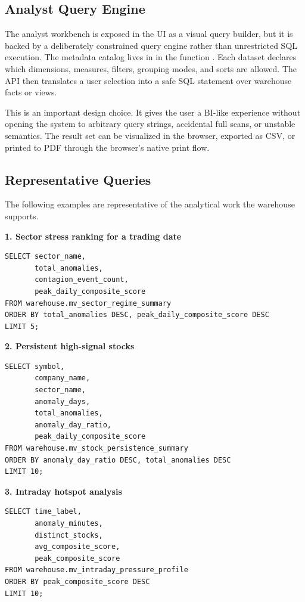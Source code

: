 \documentclass[11pt,a4paper]{article}
\begin{document}
\subsection{Analyst Query Engine}
The analyst workbench is exposed in the UI as a visual query builder, but it is backed by a deliberately constrained query engine rather than unrestricted SQL execution. The metadata catalog lives in  in the function . Each dataset declares which dimensions, measures, filters, grouping modes, and sorts are allowed. The API then translates a user selection into a safe SQL statement over warehouse facts or views.

This is an important design choice. It gives the user a BI-like experience without opening the system to arbitrary query strings, accidental full scans, or unstable semantics. The result set can be visualized in the browser, exported as CSV, or printed to PDF through the browser's native print flow.

\subsection{Representative Queries}
The following examples are representative of the analytical work the warehouse supports.

\textbf{1. Sector stress ranking for a trading date}
\begin{verbatim}
SELECT sector_name,
       total_anomalies,
       contagion_event_count,
       peak_daily_composite_score
FROM warehouse.mv_sector_regime_summary
ORDER BY total_anomalies DESC, peak_daily_composite_score DESC
LIMIT 5;
\end{verbatim}

\textbf{2. Persistent high-signal stocks}
\begin{verbatim}
SELECT symbol,
       company_name,
       sector_name,
       anomaly_days,
       total_anomalies,
       anomaly_day_ratio,
       peak_daily_composite_score
FROM warehouse.mv_stock_persistence_summary
ORDER BY anomaly_day_ratio DESC, total_anomalies DESC
LIMIT 10;
\end{verbatim}

\textbf{3. Intraday hotspot analysis}
\begin{verbatim}
SELECT time_label,
       anomaly_minutes,
       distinct_stocks,
       avg_composite_score,
       peak_composite_score
FROM warehouse.mv_intraday_pressure_profile
ORDER BY peak_composite_score DESC
LIMIT 10;
\end{verbatim}
\end{document}
